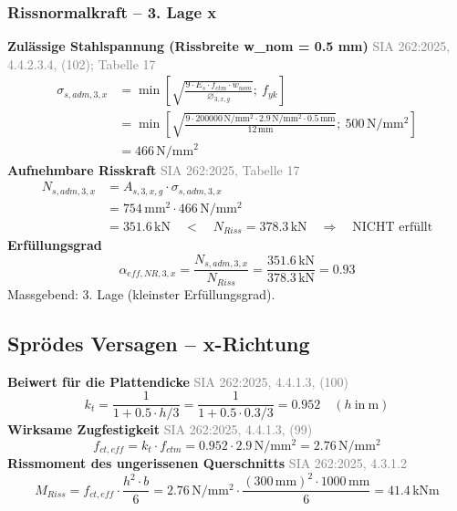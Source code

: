\documentclass[11pt,a4paper]{article}
\newcommand{\normref}[1]{{\small\textcolor{gray}{#1}}}
\begin{document}
\subsubsection{Rissnormalkraft – 3. Lage x}
\noindent\textbf{Zulässige Stahlspannung (Rissbreite w\_nom = 0.5 mm)} \hfill \normref{SIA 262:2025, 4.4.2.3.4, (102); Tabelle 17}
\begin{equation*}
\begin{aligned}
  \sigma_{s,adm,3,x} &= \min\left[\sqrt{\frac{9 \cdot E_s \cdot f_{ctm} \cdot w_{nom}}{\varnothing_{3,x,g}}};\ f_{yk}\right] \\
  &= \min\left[\sqrt{\frac{9 \cdot 200000\,\mathrm{N}/\mathrm{mm}^{2} \cdot 2.9\,\mathrm{N}/\mathrm{mm}^{2} \cdot 0.5\,\mathrm{mm}}{12\,\mathrm{mm}}};\ 500\,\mathrm{N}/\mathrm{mm}^{2}\right] \\
  &= 466\,\mathrm{N}/\mathrm{mm}^{2}
\end{aligned}
\end{equation*}
\noindent\textbf{Aufnehmbare Risskraft} \hfill \normref{SIA 262:2025, Tabelle 17}
\begin{equation*}
\begin{aligned}
  N_{s,adm,3,x} &= A_{s,3,x,g} \cdot \sigma_{s,adm,3,x} \\
  &= 754\,\mathrm{mm}^{2} \cdot 466\,\mathrm{N}/\mathrm{mm}^{2} \\
  &= 351.6\,\mathrm{kN} \quad < \quad N_{Riss} = 378.3\,\mathrm{kN} \quad \Rightarrow \quad \text{NICHT erfüllt}
\end{aligned}
\end{equation*}
\noindent\textbf{Erfüllungsgrad}
\begin{equation*}
\alpha_{eff,NR,3,x} = \frac{N_{s,adm,3,x}}{N_{Riss}} = \frac{351.6\,\mathrm{kN}}{378.3\,\mathrm{kN}} = 0.93
\end{equation*}
Massgebend: 3. Lage (kleinster Erfüllungsgrad).

\subsection{Sprödes Versagen – x-Richtung}
\noindent\textbf{Beiwert für die Plattendicke} \hfill \normref{SIA 262:2025, 4.4.1.3, (100)}
\begin{equation*}
k_t = \frac{1}{1 + 0.5 \cdot h/3} = \frac{1}{1 + 0.5 \cdot 0.3/3} = 0.952 \quad \left(h\ \text{in}\ \mathrm{m}\right)
\end{equation*}
\noindent\textbf{Wirksame Zugfestigkeit} \hfill \normref{SIA 262:2025, 4.4.1.3, (99)}
\begin{equation*}
f_{ct,eff} = k_t \cdot f_{ctm} = 0.952 \cdot 2.9\,\mathrm{N}/\mathrm{mm}^{2} = 2.76\,\mathrm{N}/\mathrm{mm}^{2}
\end{equation*}
\noindent\textbf{Rissmoment des ungerissenen Querschnitts} \hfill \normref{SIA 262:2025, 4.3.1.2}
\begin{equation*}
M_{Riss} = f_{ct,eff} \cdot \frac{h^{2} \cdot b}{6} = 2.76\,\mathrm{N}/\mathrm{mm}^{2} \cdot \frac{\left(300\,\mathrm{mm}\right)^{2} \cdot 1000\,\mathrm{mm}}{6} = 41.4\,\mathrm{kNm}
\end{equation*}
\end{document}
